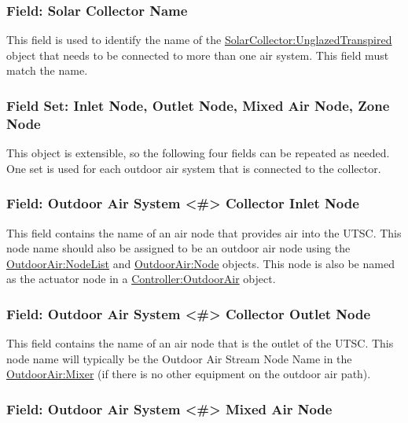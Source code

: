 \subsubsection{Field: Solar Collector Name}\label{field-solar-collector-name}

This field is used to identify the name of the \hyperref[solarcollectorunglazedtranspired]{SolarCollector:UnglazedTranspired} object that needs to be connected to more than one air system. This field must match the name.

\subsubsection{Field Set: Inlet Node, Outlet Node, Mixed Air Node, Zone Node}\label{field-set-inlet-node-outlet-node-mixed-air-node-zone-node}

This object is extensible, so the following four fields can be repeated as needed. One set is used for each outdoor air system that is connected to the collector.

\subsubsection{Field: Outdoor Air System \textless{}\#\textgreater{} Collector Inlet Node}\label{field-outdoor-air-system-collector-inlet-node}

This field contains the name of an air node that provides air into the UTSC. This node name should also be assigned to be an outdoor air node using the \hyperref[outdoorairnodelist]{OutdoorAir:NodeList} and \hyperref[outdoorairnode]{OutdoorAir:Node} objects. This node is also be named as the actuator node in a \hyperref[controlleroutdoorair]{Controller:OutdoorAir} object.

\subsubsection{Field: Outdoor Air System \textless{}\#\textgreater{} Collector Outlet Node}\label{field-outdoor-air-system-collector-outlet-node}

This field contains the name of an air node that is the outlet of the UTSC. This node name will typically be the Outdoor Air Stream Node Name in the \hyperref[outdoorairmixer]{OutdoorAir:Mixer} (if there is no other equipment on the outdoor air path).

\subsubsection{Field: Outdoor Air System \textless{}\#\textgreater{} Mixed Air Node}\label{field-outdoor-air-system-mixed-air-node}

